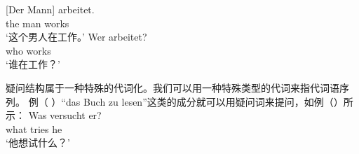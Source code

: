 \eal
\ex 
\gll {}[Der Mann] arbeitet.\\
	 \spacebr{}the man works\\
\glt `这个男人在工作。'
\ex 
\gll Wer arbeitet?\\
	 who works\\
\glt `谁在工作？'
\zl

\noindent
疑问结构属于一种特殊的代词化。我们可以用一种特殊类型的代词来指代词语序列。
例（ ）“das Buch zu lesen”这类的成分就可以用疑问词来提问，如例（）所示：
\ea
\gll Was versucht er?\\
     what tries he\\
\glt `他想试什么？'
\z


